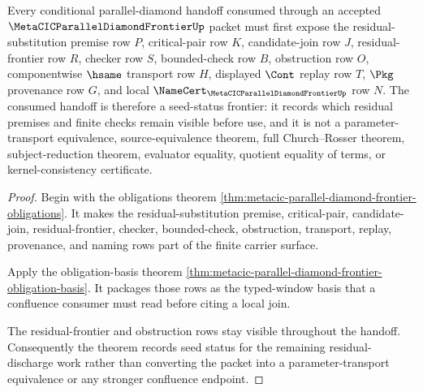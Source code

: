 \begin{theorem}
\label{thm:metacic-parallel-diamond-frontier-seed-status}
Every conditional parallel-diamond handoff consumed through an accepted $\MetaCICParallelDiamondFrontierUp$ packet must first expose the residual-substitution premise row $P$, critical-pair row $K$, candidate-join row $J$, residual-frontier row $R$, checker row $S$, bounded-check row $B$, obstruction row $O$, componentwise $\hsame$ transport row $H$, displayed $\Cont$ replay row $T$, $\Pkg$ provenance row $G$, and local $\NameCert_{\MetaCICParallelDiamondFrontierUp}$ row $N$. The consumed handoff is therefore a seed-status frontier: it records which residual premises and finite checks remain visible before use, and it is not a parameter-transport equivalence, source-equivalence theorem, full Church--Rosser theorem, subject-reduction theorem, evaluator equality, quotient equality of terms, or kernel-consistency certificate.
\end{theorem}
\begin{proof}
Begin with the obligations theorem \autoref{thm:metacic-parallel-diamond-frontier-obligations}. It makes the residual-substitution premise, critical-pair, candidate-join, residual-frontier, checker, bounded-check, obstruction, transport, replay, provenance, and naming rows part of the finite carrier surface.

Apply the obligation-basis theorem \autoref{thm:metacic-parallel-diamond-frontier-obligation-basis}. It packages those rows as the typed-window basis that a confluence consumer must read before citing a local join.

The residual-frontier and obstruction rows stay visible throughout the handoff. Consequently the theorem records seed status for the remaining residual-discharge work rather than converting the packet into a parameter-transport equivalence or any stronger confluence endpoint.
\end{proof}

